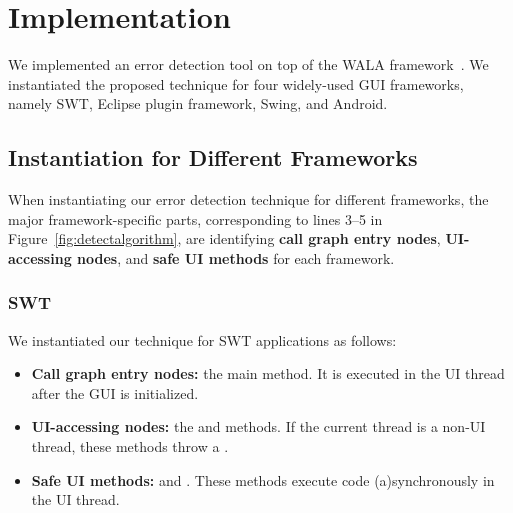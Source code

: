 
\tinystep
\tinystep
\section{Implementation}
\label{sec:implementation}

We implemented an error detection tool on top of the WALA framework~\cite{walatutorial}.
We instantiated the proposed technique for four widely-used
GUI frameworks, namely SWT, Eclipse plugin framework, Swing, and Android.

\tinystep


\subsection{Instantiation for Different Frameworks}
\label{sec:platforms}

When instantiating our error detection technique for different
frameworks, the major framework-specific parts, corresponding to
lines 3--5 in Figure~\ref{fig:detectalgorithm}, are identifying
\textbf{call graph entry nodes}, \textbf{UI-accessing nodes},
and \textbf{safe UI methods} for each framework.

\tinystep
\subsubsection{SWT}

 We instantiated our technique for SWT applications as follows:

\preitemizespace

\begin{itemize}

\item \textbf{Call graph entry nodes:}  the main method. 
It is executed in the UI thread after the GUI
is initialized.

\smallstep

\item \textbf{UI-accessing nodes:}  the 
and  methods.
If the current thread is a non-UI thread, these
methods throw a .


\smallstep

\item \textbf{Safe UI methods:}  
and .
These methods
execute code (a)synchro\-nously in the UI thread.

\end{itemize}

